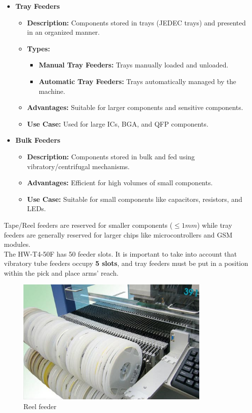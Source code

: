 \documentclass[a4paper,10pt]{report}
\begin{document}
\begin{itemize}
    \item \textbf{Tray Feeders}
    \begin{itemize}
        \item \textbf{Description:} Components stored in trays (JEDEC trays) and presented in an organized manner.
        \item \textbf{Types:}
        \begin{itemize}
            \item \textbf{Manual Tray Feeders:} Trays manually loaded and unloaded.
            \item \textbf{Automatic Tray Feeders:} Trays automatically managed by the machine.
        \end{itemize}
        \item \textbf{Advantages:} Suitable for larger components and sensitive components.
        \item \textbf{Use Case:} Used for large ICs, BGA, and QFP components.
    \end{itemize}


    \item \textbf{Bulk Feeders}
    \begin{itemize}
        \item \textbf{Description:} Components stored in bulk and fed using vibratory/centrifugal mechanisms.
        \item \textbf{Advantages:} Efficient for high volumes of small components.
        \item \textbf{Use Case:} Suitable for small components like capacitors, resistors, and LEDs.
    \end{itemize}
\end{itemize}
Tape/Reel feeders are reserved for smaller components ($\leq 1mm$) while tray feeders are generally reserved for larger chips like microcontrollers and GSM modules.\\
\newpage
The HW-T4-50F has 50 feeder slots. It is important to take into account that vibratory tube feeders occupy \textbf{5 slots}, and tray feeders must be put in a position within the pick and place arms' reach.
\begin{figure}[!htb]
 \centering
 \includegraphics[width=0.85\textwidth]{images/reel_tape.jpg}
 \caption{Reel feeder}
\end{figure}
\end{document}
